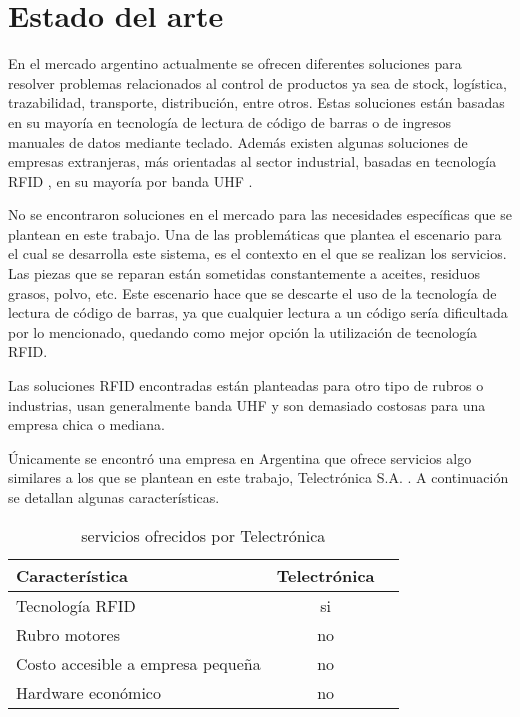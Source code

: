 
\section{Estado del arte}

En el mercado argentino actualmente se ofrecen diferentes soluciones para resolver problemas relacionados al control de productos ya sea de stock, logística, trazabilidad, transporte, distribución, entre otros. Estas soluciones están basadas en su mayoría en tecnología de lectura de código de barras o de ingresos manuales de datos mediante teclado. Además existen algunas soluciones de empresas extranjeras, más orientadas al sector industrial, basadas en tecnología RFID \citep{WEBSITE:RFID}, en su mayoría por banda UHF \citep{WEBSITE:UHF}.

No se encontraron soluciones en el mercado para las necesidades específicas que se plantean en este trabajo. Una de las problemáticas que plantea el escenario para el cual se desarrolla este sistema, es el contexto en el que se realizan los servicios. Las piezas que se reparan están sometidas constantemente a aceites, residuos grasos, polvo, etc. Este escenario hace que se descarte el uso de la tecnología de lectura de código de barras, ya que cualquier lectura a un código sería dificultada por lo mencionado, quedando como mejor opción la utilización de tecnología RFID.

Las soluciones RFID encontradas están planteadas para otro tipo de rubros o industrias, usan generalmente banda UHF y son demasiado costosas para una empresa chica o mediana. 

Únicamente se encontró una empresa en Argentina que ofrece servicios algo similares a los que se plantean en este trabajo, Telectrónica S.A. \citep{WEBSITE:TELECTRONICA}. A continuación se detallan algunas características.

\begin{table}[h]
	\centering
	\caption[caption corto]{servicios ofrecidos por Telectrónica}
	\begin{tabular}{l c c}    
		\toprule
		\textbf{Característica} 	 & \textbf{Telectrónica} 		  \\
		\midrule
		Tecnología RFID	 & si				 \\
		Rubro motores & no \\		
		Costo accesible a empresa pequeña	 & no				 \\
		Hardware económico	 & no				 \\
		\bottomrule
		\hline
	\end{tabular}
	\label{tab:peces}
\end{table}

